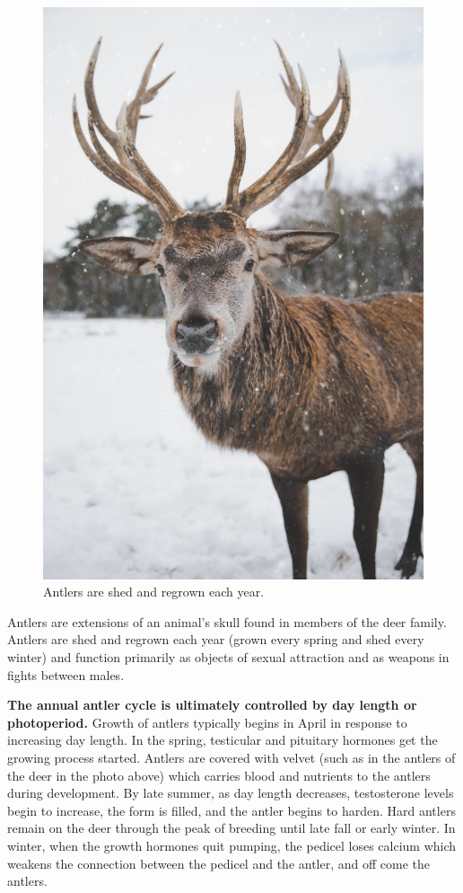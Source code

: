 \documentclass[]{book}
\begin{document}
\begin{figure}

{\centering \includegraphics[width=0.6\linewidth]{figures/antler} 

}

\caption{Antlers are shed and regrown each year.}\label{fig:antler}
\end{figure}

Antlers are extensions of an animal's skull found in members of the deer
family. Antlers are shed and regrown each year (grown every spring and
shed every winter) and function primarily as objects of sexual
attraction and as weapons in fights between males.

\textbf{The annual antler cycle is ultimately controlled by day length
or photoperiod.} Growth of antlers typically begins in April in response
to increasing day length. In the spring, testicular and pituitary
hormones get the growing process started. Antlers are covered with
velvet (such as in the antlers of the deer in the photo above) which
carries blood and nutrients to the antlers during development. By late
summer, as day length decreases, testosterone levels begin to increase,
the form is filled, and the antler begins to harden. Hard antlers remain
on the deer through the peak of breeding until late fall or early
winter. In winter, when the growth hormones quit pumping, the pedicel
loses calcium which weakens the connection between the pedicel and the
antler, and off come the antlers.
\end{document}
